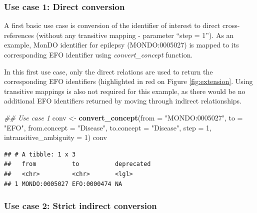 \documentclass[9pt,a4paper,]{extarticle}
\newenvironment{Shaded}{\begin{snugshade}}{\end{snugshade}}
\newcommand{\CommentTok}[1]{\textcolor[rgb]{0.56,0.35,0.01}{\textit{#1}}}
\newcommand{\DataTypeTok}[1]{\textcolor[rgb]{0.13,0.29,0.53}{#1}}
\newcommand{\DecValTok}[1]{\textcolor[rgb]{0.00,0.00,0.81}{#1}}
\newcommand{\KeywordTok}[1]{\textcolor[rgb]{0.13,0.29,0.53}{\textbf{#1}}}
\newcommand{\NormalTok}[1]{#1}
\newcommand{\StringTok}[1]{\textcolor[rgb]{0.31,0.60,0.02}{#1}}
\begin{document}
\hypertarget{use-case-1-direct-conversion}{%
\subsubsection{Use case 1: Direct conversion}\label{use-case-1-direct-conversion}}

A first basic use case is conversion of the identifier of interest to direct cross-references (without any transitive mapping - parameter ``step = 1''). As an example, MonDO identifier for epilepsy (MONDO:0005027) is mapped to its corresponding EFO identifier using \emph{convert\_concept} function.

In this first use case, only the direct relations are used to return the corresponding EFO identifiers (highlighted in red on Figure \ref{fig:extension}. Using transitive mappings is also not required for this example, as there would be no additional EFO identifiers returned by moving through indirect relationships.

\begin{Shaded}
\begin{Highlighting}[]
\CommentTok{## Use case 1}
\NormalTok{conv <-}\StringTok{ }\KeywordTok{convert_concept}\NormalTok{(}\DataTypeTok{from =} \StringTok{"MONDO:0005027"}\NormalTok{,}
                         \DataTypeTok{to =} \StringTok{"EFO"}\NormalTok{,}
                         \DataTypeTok{from.concept =} \StringTok{"Disease"}\NormalTok{,}
                         \DataTypeTok{to.concept =} \StringTok{"Disease"}\NormalTok{,}
                         \DataTypeTok{step =} \DecValTok{1}\NormalTok{,}
                         \DataTypeTok{intransitive_ambiguity =} \DecValTok{1}\NormalTok{)}
\NormalTok{conv}
\end{Highlighting}
\end{Shaded}

\begin{verbatim}
## # A tibble: 1 x 3
##   from          to          deprecated
##   <chr>         <chr>       <lgl>     
## 1 MONDO:0005027 EFO:0000474 NA
\end{verbatim}

\hypertarget{use-case-2-strict-indirect-conversion}{%
\subsubsection{Use case 2: Strict indirect conversion}\label{use-case-2-strict-indirect-conversion}}
\end{document}
